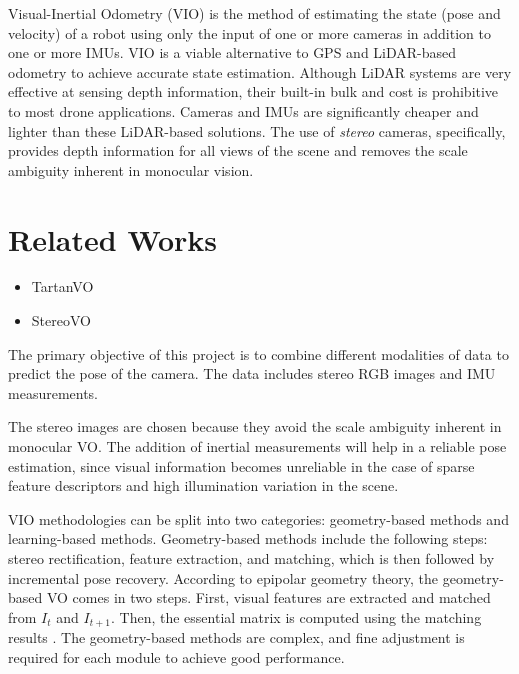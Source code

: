 \documentclass[10pt,letterpaper]{article}
\begin{document}
Visual-Inertial Odometry (VIO) is the method of estimating the state (pose and velocity) of a robot using only the input of one or more cameras in addition to one or more IMUs. VIO is a viable alternative to GPS and LiDAR-based odometry to achieve accurate state estimation. Although LiDAR systems are very effective at sensing depth information, their built-in bulk and cost is prohibitive to most drone applications. Cameras and IMUs are significantly cheaper and lighter than these LiDAR-based solutions. The use of \textit{stereo} cameras, specifically, provides depth information for all views of the scene and removes the scale ambiguity inherent in monocular vision. 



 
\section{Related Works}
\begin{itemize}
    \item TartanVO
    \item StereoVO
\end{itemize}

The primary objective of this project is to combine different modalities of data to predict the pose of the camera. The data includes stereo RGB images and IMU measurements. 

The stereo images are chosen because they avoid the scale ambiguity inherent in monocular VO. The addition of inertial measurements will help in a reliable pose estimation, since visual information becomes unreliable in the case of sparse feature descriptors and high illumination variation in the scene. 

VIO methodologies can be split into two categories: geometry-based methods and learning-based methods. Geometry-based methods include the following steps: stereo rectification, feature extraction, and matching, which is then followed by incremental pose recovery. According to epipolar geometry theory, the geometry-based VO comes in two steps. First, visual features are extracted and matched from $I_t$ and $I_{t+1}$. Then, the essential matrix is computed using the matching results \cite{beall2014stereo}. The geometry-based methods are complex, and fine adjustment is required for each module to achieve good performance. 
\end{document}
